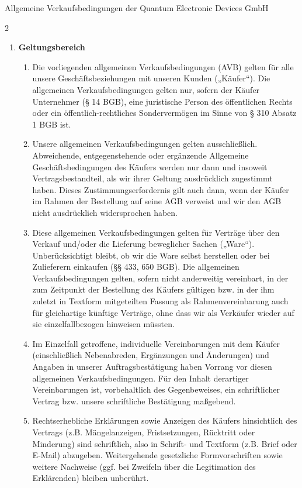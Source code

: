 \documentclass[%
    a4paper,%
    10pt,
]{scrartcl}
\def\DocType{%
Allgemeine Verkaufsbedingungen
}
\begin{document}
  \DocType der Quantum Electronic Devices GmbH

  \begin{multicols}{2}
    \begin{enumerate}
     \item \textbf{Geltungsbereich}%
      \begin{enumerate}
        \item Die vorliegenden allgemeinen Verkaufsbedingungen (AVB) gelten für alle unsere Geschäftsbeziehungen mit unseren Kunden („Käufer“). Die allgemeinen Verkaufsbedingungen gelten nur, sofern der Käufer Unternehmer (§ 14 BGB), eine juristische Person des öffentlichen Rechts oder ein öffentlich-rechtliches Sondervermögen im Sinne von § 310 Absatz 1 BGB ist.
        \item Unsere allgemeinen Verkaufsbedingungen gelten ausschließlich. Abweichende, entgegenstehende oder ergänzende Allgemeine Geschäftsbedingungen des Käufers werden nur dann und insoweit Vertragsbestandteil, als wir ihrer Geltung ausdrücklich zugestimmt haben. Dieses Zustimmungserfordernis gilt auch dann, wenn der Käufer im Rahmen der Bestellung auf seine AGB verweist und wir den AGB nicht ausdrücklich widersprochen haben.
        \item Diese allgemeinen Verkaufsbedingungen gelten für Verträge über den Verkauf und/oder die Lieferung beweglicher Sachen („Ware“). Unberücksichtigt bleibt, ob wir die Ware selbst herstellen oder bei Zulieferern einkaufen (§§ 433, 650 BGB). Die allgemeinen Verkaufsbedingungen gelten, sofern nicht anderweitig vereinbart, in der zum Zeitpunkt der Bestellung des Käufers gültigen bzw. in der ihm zuletzt in Textform mitgeteilten Fassung als Rahmenvereinbarung auch für gleichartige künftige Verträge, ohne dass wir als Verkäufer wieder auf sie einzelfallbezogen hinweisen müssten.
        \item Im Einzelfall getroffene, individuelle Vereinbarungen mit dem Käufer (einschließlich Nebenabreden, Ergänzungen und Änderungen) und Angaben in unserer Auftragsbestätigung haben Vorrang vor diesen allgemeinen Verkaufsbedingungen. Für den Inhalt derartiger Vereinbarungen ist, vorbehaltlich des Gegenbeweises, ein schriftlicher Vertrag bzw. unsere schriftliche Bestätigung maßgebend.
        \item Rechtserhebliche Erklärungen sowie Anzeigen des Käufers hinsichtlich des Vertrags (z.B. Mängelanzeigen, Fristsetzungen, Rücktritt oder Minderung) sind schriftlich, also in Schrift- und Textform (z.B. Brief oder E-Mail) abzugeben. Weitergehende gesetzliche Formvorschriften sowie weitere Nachweise (ggf. bei Zweifeln über die Legitimation des Erklärenden) bleiben unberührt.

\end{enumerate}
\end{enumerate}
\end{multicols}
\end{document}
